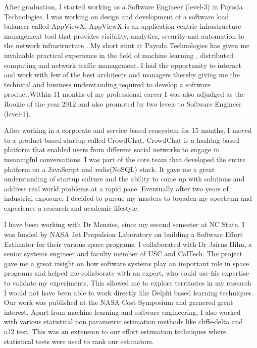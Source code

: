 \documentclass{article}
\begin{document}
\bigskip

After graduation, I started working as a Software Engineer (level-3) in Payoda Technologies. I was working on design and development of a software load balancer called AppViewX. AppViewX is an application centric infrastructure management tool that provides visibility, analytics, security and automation to the network infrastructure . My short stint at Payoda
Technologies has given me invaluable practical experience in the field of machine learning , 
distributed computing and network traffic management. I had the opportunity to interact and 
work with few of the best architects and managers thereby giving me the technical and business
understanding required to develop a software product.Within 11 months of my professional career I was also adjudged as the Rookie of the year 2012 and also promoted by two levels to Software Engineer (level-1). 

\bigskip
After working in a corporate and service based ecosystem for 15 months, I moved to a product based startup called CrowdChat. CrowdChat is a hashtag based platform that enabled users from different social 
networks to engage in meaningful conversations. I was part of the  core team that developed 
the entire platform on a JavaScript and redis(NoSQL) stack. It gave me a great understanding  of startup
culture and the ability to come up with solutions and address real world problems at a rapid pace. Eventually
after two years of industrial exposure, I decided to pursue my masters to broaden my spectrum
and experience a research and academic lifestyle.


\bigskip
I have been working with Dr Menzies, since my second semester at NC State. I was funded by NASA Jet Propulsion Laboratory on building a Software Effort Estimator for their various space programs. I collaborated with Dr Jairus Hihn, a senior systems engineer and faculty member of USC and CalTech. The project gave me a great insight on how software systems play an important role in space programs and helped me collaborate with an expert, who could use his expertise to validate my experiments. This allowed me to explore territories in my research I would not have been able to work directly like Delphi based learning techniques. Our work was published at the NASA Cost Symposium and garnered great interest. Apart from machine learning and software engineering, I also worked with various statistical non parametric estimation methods like cliffs-delta and a12 test. This was an extension to our effort estimation techniques where statistical tests were used to rank our estimators.
\end{document}
